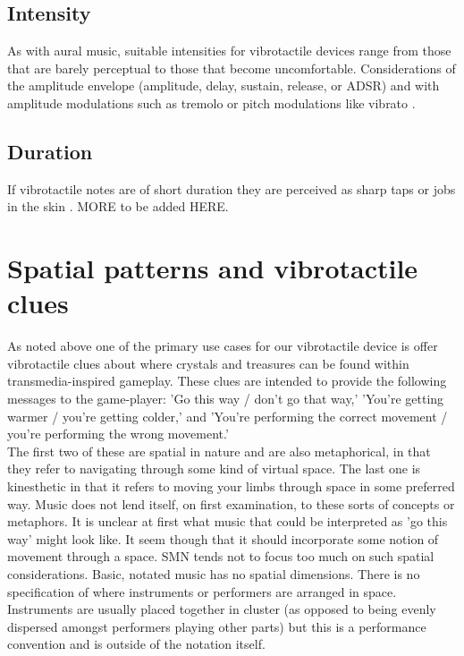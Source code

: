 \documentclass[a4paper, twocolumn]{article}
\begin{document}
\subsection{Intensity}
As with aural music, suitable intensities for vibrotactile devices range from those that are barely perceptual to those that become uncomfortable. Considerations of the amplitude envelope (amplitude, delay, sustain, release, or ADSR) and with amplitude modulations such as tremolo or pitch modulations like vibrato \cite{gunther2003cutaneous}. 

\subsection{Duration}
If vibrotactile notes are of short duration they are perceived as sharp taps or jobs in the skin \cite{gunther2003cutaneous}. MORE to be added HERE.

\section{Spatial patterns and vibrotactile clues}
As noted above one of the primary use cases for our vibrotactile device is offer vibrotactile clues about where crystals and treasures can be found within transmedia-inspired gameplay. These clues are intended to provide the following messages to the game-player: 'Go this way / don't go that way,'
'You're getting warmer / you're getting colder,' and 
'You're performing the correct movement / you're performing the wrong movement.'\\

The first two of these are spatial in nature and are also metaphorical, in that they refer to navigating through some kind of virtual space. The last one is kinesthetic in that it refers to moving your limbs through space in some preferred way. Music does not lend itself, on first examination, to these sorts of concepts or metaphors. It is unclear at first what music that could be interpreted as 'go this way' might look like. It seem though that it should incorporate some notion of movement through a space. SMN tends not to focus too much on such spatial considerations. Basic, notated music has no spatial dimensions. There is no specification of where instruments or performers are arranged in space. Instruments are usually placed together in cluster (as opposed to being evenly dispersed amongst performers playing other parts) but this is a performance convention and is outside of the notation itself.\\
\end{document}
